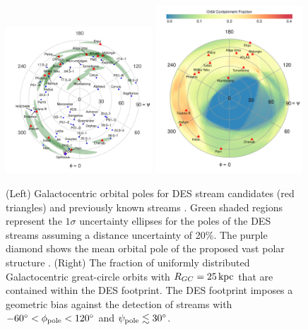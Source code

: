 \documentclass[twocolumn]{aastex61}
\begin{document}
\begin{figure}[t]
\centering
\includegraphics[width=0.49\textwidth]{poles_for_all_streamsv5p1_w_VPOS_2015.pdf}
\includegraphics[width=0.49\textwidth]{stream_detection_efficiency_v5p1.pdf}
\caption{
(Left) Galactocentric orbital poles for DES stream candidates (red triangles) and previously known streams \citep[blue circles;][]{Mateu:2017,Jethwa:2017}.
Green shaded regions represent the $1\sigma$ uncertainty ellipses for the poles of the DES streams assuming a distance uncertainty of 20\%.
The purple diamond shows the mean orbital pole of the proposed vast polar structure \citep{Pawlowski:2015}.
(Right) The fraction of uniformly distributed Galactocentric great-circle orbits with $R_{GC}= 25 \mathrm{\,kpc}$ that are contained within the DES footprint.
The DES footprint imposes a geometric bias against the detection of streams with $-60{}^{\circ} < \phi_{\rm pole} < 120{}^{\circ}$ and $\psi_{\rm pole} \lesssim 30{}^{\circ}$.
}
\label{fig:stream_poles}
\end{figure}
\end{document}
